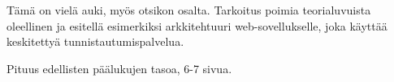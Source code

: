 Tämä on vielä auki, myös otsikon osalta. Tarkoitus poimia teorialuvuista oleellinen ja esitellä esimerkiksi arkkitehtuuri web-sovellukselle, joka käyttää keskitettyä tunnistautumispalvelua.

Pituus edellisten päälukujen tasoa, 6-7 sivua.